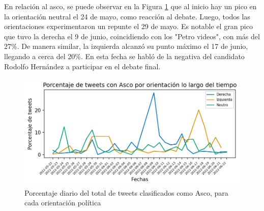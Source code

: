 En relación al asco, se puede observar en la Figura \ref{figure:tweets_percent_Asco_tiempo} que al inicio hay un pico en la orientación neutral el 24 de mayo, como reacción al debate. Luego, todos las orientaciones experimentaron un repunte el 29 de mayo. Es notable el gran pico que tuvo la derecha el 9 de junio, coincidiendo con los "Petro videos", con más del 27\%. De manera similar, la izquierda alcanzó su punto máximo el 17 de junio, llegando a cerca del 20\%. En esta fecha se habló de la negativa del candidato Rodolfo Hernández a participar en el debate final.

\begin{figure}[!htbp]
	\centering
	\includegraphics{Images & Logos/Results/Porcentaje de tweets con Asco por sector lo largo del tiempo.png} 
	\caption{Porcentaje diario del total de tweets clasificados como Asco, para cada orientación política}
	\label{figure:tweets_percent_Asco_tiempo}
\end{figure}














